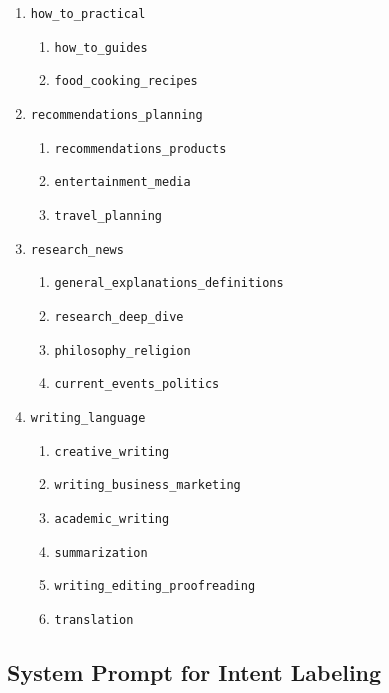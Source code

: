 \documentclass{article}
\begin{document}
\begin{enumerate}
    \item \texttt{how\_to\_practical}
    \begin{enumerate}
        \item \texttt{how\_to\_guides}
        \item \texttt{food\_cooking\_recipes}
    \end{enumerate}

    \item \texttt{recommendations\_planning}
    \begin{enumerate}
        \item \texttt{recommendations\_products}
        \item \texttt{entertainment\_media}
        \item \texttt{travel\_planning}
    \end{enumerate}

    \item \texttt{research\_news}
    \begin{enumerate}
        \item \texttt{general\_explanations\_definitions}
        \item \texttt{research\_deep\_dive}
        \item \texttt{philosophy\_religion}
        \item \texttt{current\_events\_politics}
    \end{enumerate}

    \item \texttt{writing\_language}
    \begin{enumerate}
        \item \texttt{creative\_writing}
        \item \texttt{writing\_business\_marketing}
        \item \texttt{academic\_writing}
        \item \texttt{summarization}
        \item \texttt{writing\_editing\_proofreading}
        \item \texttt{translation}
    \end{enumerate}
\end{enumerate}




\subsection{System Prompt for Intent Labeling}
\label{app:system_prompt}
\end{document}
